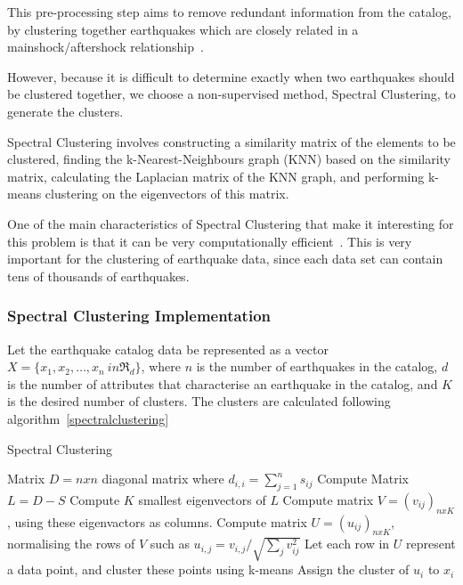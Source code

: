 This pre-processing step aims to remove redundant information from the
catalog, by clustering together earthquakes which are closely related
in a mainshock/aftershock relationship~\cite{van2012seismicity}.

However, because it is difficult to determine exactly when two
earthquakes should be clustered together, we choose a non-supervised
method, Spectral Clustering, to generate the clusters.

Spectral Clustering involves constructing a similarity matrix of the
elements to be clustered, finding the k-Nearest-Neighbours graph (KNN)
based on the similarity matrix, calculating the Laplacian matrix of
the KNN graph, and performing k-means clustering on the eigenvectors
of this matrix.

One of the main characteristics of Spectral Clustering that make it
interesting for this problem is that it can be very computationally
efficient~\cite{Ye2016}. This is very important for the clustering of
earthquake data, since each data set can contain tens of thousands of
earthquakes.

\subsubsection*{Spectral Clustering Implementation}

Let the earthquake catalog data be represented as a vector $X = \{x_1,
x_2, \ldots, x_n\ in \Re_d\}$, where $n$ is the number of earthquakes
in the catalog, $d$ is the number of attributes that characterise an
earthquake in the catalog, and $K$ is the desired number of
clusters. The clusters are calculated following
algorithm~\ref{spectralclustering}

\begin{algorithm}[H]\label{spectralclustering}
  \caption{Spectral Clustering}
  \begin{algorithmic}
    \ELSE
    \ENDIF
    \ENDFOR
    \ENDFOR
    \STATE Matrix $D = n x n$ diagonal matrix where $d_{i,i} = \sum^n_{j=1}s_{ij}$
    \STATE Compute Matrix $L = D - S$
    \STATE Compute $K$ smallest eigenvectors of $L$
    \STATE Compute matrix $V = (v_{ij})_{nxK}$, using these eigenvactors as columns.
    \STATE Compute matrix $U = (u_{ij})_{nxK}$, normalising the rows
    of $V$ such as $u_{i,j} = v_{i,j}/\sqrt{\sum_jv^2_{ij}}$
    \STATE Let each row in $U$ represent a data point, and cluster
    these points using k-means
    \STATE Assign the cluster of $u_i$ to $x_i$
    \ENDFOR
  \end{algorithmic}
\end{algorithm}

